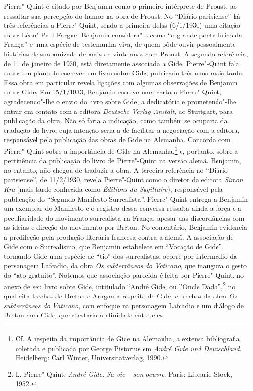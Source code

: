Pierre"-Quint é citado por Benjamin como o primeiro intérprete de Proust,
ao ressaltar sua percepção do humor na obra de Proust. No ``Diário
parisiense'' há três referências a Pierre"-Quint, sendo a primeira delas
(6/1/1930) uma citação sobre Léon"-Paul Fargue. Benjamin considera"-o como
``o grande poeta lírico da França'' e uma espécie de testemunha viva, de
quem pôde ouvir pessoalmente histórias de sua amizade de mais de vinte
anos com Proust. A segunda referência, de 11 de janeiro de 1930, está
diretamente associada a Gide. Pierre"-Quint fala sobre seu plano de
escrever um livro sobre Gide, publicado três anos mais tarde. Essa obra
em particular revela ligações com algumas observações de Benjamin sobre
Gide. Em 15/1/1933, Benjamin escreve uma carta a Pierre"-Quint,
agradecendo"-lhe o envio do livro sobre Gide, a dedicatória e
prometendo"-lhe entrar em contato com a editora \emph{Deutsche Verlag
Anstalt}, de Stuttgart, para publicação da obra. Não só faria a
indicação, como também se ocuparia da tradução do livro, cuja intenção
seria a de facilitar a negociação com a editora, responsável pela
publicação das obras de Gide na Alemanha. Concorda com Pierre"-Quint
sobre a importância de Gide na Alemanha,\footnote{Cf. A respeito da
  importância de Gide na Alemanha, a extensa bibliografia coletada e
  publicada por George Pistorius em \emph{André Gide und Deutschland}.
  Heidelberg: Carl Winter, Universitätverlag, 1990.} e, portanto, sobre
a pertinência da publicação do livro de Pierre"-Quint na versão alemã.
Benjamin, no entanto, não chegou de traduzir a obra. A terceira %
referência no ``Diário parisiense'', de 11/2/1930, revela Pierre"-Quint
como o diretor da editora \emph{Simon Kra} (mais tarde conhecida como
\emph{Éditions du Sagittaire}), responsável pela publicação do ``Segundo
Manifesto Surrealista''. Pierre"-Quint entrega a Benjamin um exemplar do
Manifesto e o registro dessa conversa ressalta ainda a força e a
peculiaridade do movimento surrealista na França, apesar das
discordâncias com as ideias e direção do movimento por Breton. No
comentário, Benjamin evidencia a predileção pela produção literária
francesa contra a alemã. A associação de Gide com o Surrealismo, que
Benjamin estabelece em ``Vocação de Gide'', tornando Gide uma espécie de
``tio'' dos surrealistas, ocorre por intermédio da personagem
Lafcadio, da obra \emph{Os subterrâneos do Vaticano}, que
inaugura o gesto do ``ato gratuito''. Notemos que associação parecida é
feita por Pierre"-Quint, no anexo de seu livro sobre Gide, intitulado
``André Gide, ou l'Oncle Dada'',\footnote{L. Pierre"-Quint, \emph{André
  Gide. Sa vie -- son oeuvre}. Paris: Librarie Stock, 1952.} no qual
cita trechos de Breton e Aragon a respeito de Gide, e trechos da obra
\emph{Os subterrâneos do Vaticano}, com enfoque na personagem
Lafcadio e um diálogo de Breton com Gide, que atestaria a afinidade
entre eles.

